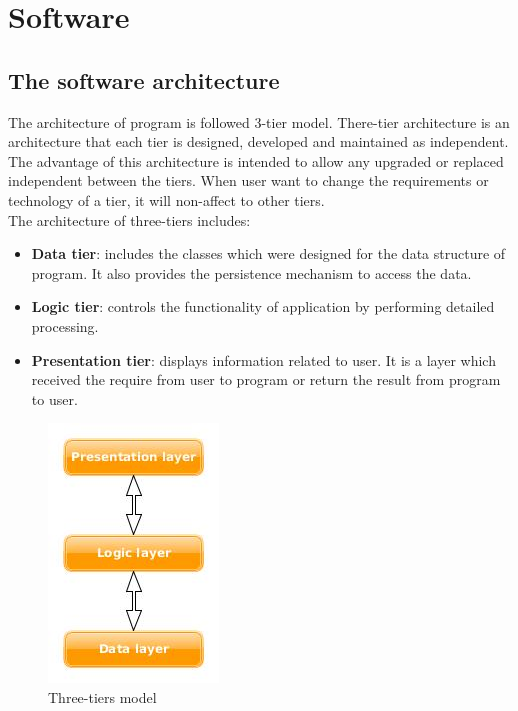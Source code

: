 \chapter{Software}
\section{The software architecture}
The architecture of program is followed 3-tier model. There-tier architecture is an architecture that each tier is designed, developed and maintained as independent. The advantage of this architecture is intended to allow any upgraded or replaced independent between the tiers. When user want to change the requirements or technology of a tier, it will non-affect to other tiers.\\[0.3cm]
The architecture of three-tiers includes:
\begin{itemize}
	\item \textbf{Data tier}: includes the classes which were designed for the data structure of program. It also provides the persistence mechanism to access the data.
	\item \textbf{Logic tier}: controls the functionality of application by performing detailed processing.
	\item \textbf{Presentation tier}: displays information related to user. It is a layer which received the require from user to program or return the result from program to user. 
\end{itemize}
\begin{figure}[h]
	\centering
	\includegraphics[scale=0.7]{images/software_3tiers}
	\caption{Three-tiers model}
	\label{fign3iters}
\end{figure}
